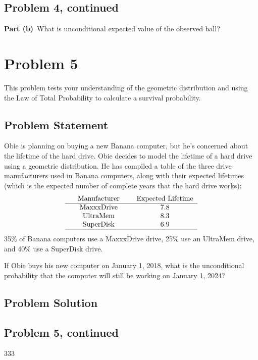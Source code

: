 \documentclass[12pt]{article}
\theoremstyle{definition}
\begin{document}
\newpage
\subsection*{Problem 4, continued}

\vspace{2in}
\noindent
{\bf Part (b)}\ What is unconditional expected value of the observed ball?





\newpage
\section*{Problem 5}

This problem tests your understanding of the geometric distribution and using the Law of Total Probability to calculate a survival probability.

\subsection*{Problem Statement}

Obie is planning on buying a new Banana computer, but he's concerned about the lifetime of the hard drive. Obie decides to model the lifetime of a hard drive using a geometric distribution. He has compiled a table of the three drive manufacturers used in Banana computers, along with their expected lifetimes (which is the expected number of complete years that the hard drive works):
$$
\begin{tabular}{ccccc}
& Manufacturer & & Expected Lifetime\\
\hline
& MaxxxDrive & & 7.8\\
& UltraMem & & 8.3\\
& SuperDisk & & 6.9\\
\hline
\end{tabular}
$$
35\% of Banana computers use a MaxxxDrive drive, 25\% use an UltraMem drive, and 40\% use a SuperDisk drive.

\bigskip
If Obie buys his new computer on January 1, 2018, what is the unconditional probability that the computer will still be working on January 1, 2024?


\subsection*{Problem Solution}

\newpage
\subsection*{Problem 5, continued}
333
\end{document}
